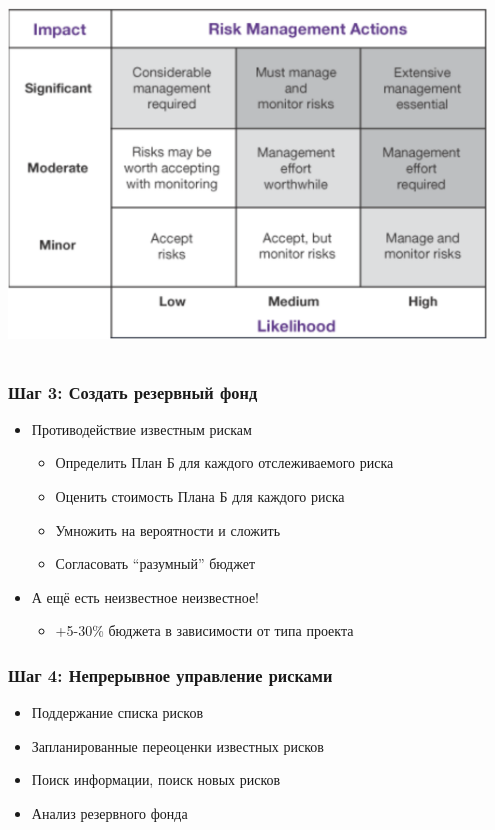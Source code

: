 \documentclass{../../slides-style}
\begin{document}
\begin{frame}
\begin{columns}
\begin{column}{0.4\textwidth}
\begin{center}
                    \includegraphics[width=0.95\textwidth]{riskMatrix.png}
                \end{center}
            \end{column}
        \end{columns}
    \end{frame}

    \begin{frame}
        \frametitle{Шаг 3: Создать резервный фонд}
        \begin{itemize}
            \item Противодействие известным рискам
            \begin{itemize}
                \item Определить План Б для каждого отслеживаемого риска
                \item Оценить стоимость Плана Б для каждого риска
                \item Умножить на вероятности и сложить
                \item Согласовать \enquote{разумный} бюджет
            \end{itemize}
            \item А ещё есть неизвестное неизвестное!
            \begin{itemize}
                \item +5-30\% бюджета в зависимости от типа проекта
            \end{itemize}
        \end{itemize}
    \end{frame}

    \begin{frame}
        \frametitle{Шаг 4: Непрерывное управление рисками}
        \begin{itemize}
            \item Поддержание списка рисков
            \item Запланированные переоценки известных рисков
            \item Поиск информации, поиск новых рисков
            \item Анализ резервного фонда
        \end{itemize}
    \end{frame}
\end{document}
